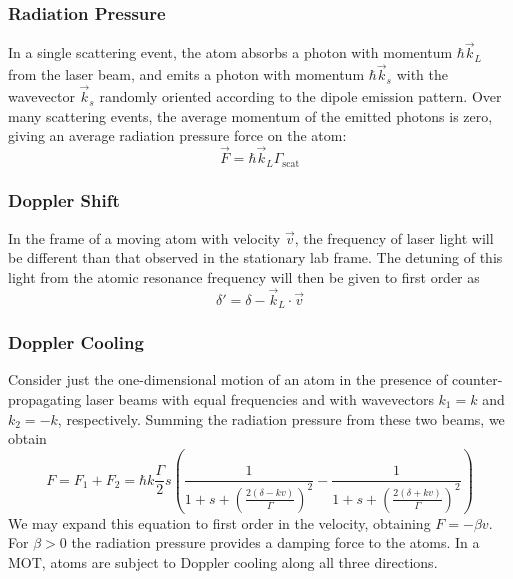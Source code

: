 \documentclass{../lab}
\begin{document}
\subsubsection{Radiation Pressure}

In a single scattering event, the atom absorbs a photon with momentum $\hbar\vec{k}_L$ from the laser beam, and emits a photon with momentum $\hbar\vec{k}_s$ with the wavevector $\vec{k}_s$ randomly oriented according to the dipole emission pattern. Over many scattering events, the average momentum of the emitted photons is zero, giving an average radiation pressure force on the atom:
\begin{equation}
    \vec{F} = \hbar \vec{k}_L \Gamma_\text{scat}
\end{equation}

\subsubsection{Doppler Shift}
\label{sec:dopplershift}

In the frame of a moving atom with velocity $\vec{v}$, the frequency of laser light will be different than that observed in the stationary lab frame. The detuning of this light from the atomic resonance frequency will then be given to first order as
\begin{equation}
    \delta' = \delta - \vec{k}_L\cdot \vec{v}
\end{equation}

\subsubsection{Doppler Cooling}


Consider just the one-dimensional motion of an atom in the presence of counter-propagating laser beams with equal frequencies and with wavevectors $k_1 = k$ and $k_2 = -k$, respectively. Summing the radiation pressure from these two beams, we obtain
\begin{equation}
    F = F_1 + F_2 = \hbar k \frac{\Gamma}{2}s\left(\frac{1}{1+s+\left(\frac{2(\delta-kv)}{\Gamma}\right)^2}-\frac{1}{1+s+\left(\frac{2(\delta+kv)}{\Gamma}\right)^2}\right)
\end{equation}
We may expand this equation to first order in the velocity, obtaining $F = -\beta v$. For $\beta > 0$ the radiation pressure provides a damping force to the atoms. In a MOT, atoms are subject to Doppler cooling along all three directions.
\end{document}
